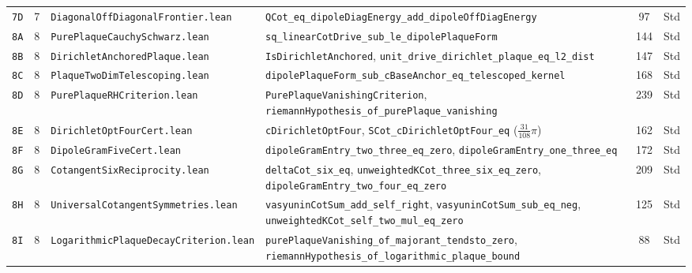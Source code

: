 \documentclass[11pt,a4paper]{article}
\theoremstyle{definition}
\begin{document}
\begin{longtable}{@{}ll>{\raggedright\arraybackslash}p{5.2cm}>{\raggedright\arraybackslash}p{6.8cm}cc@{}}
\texttt{7D} & 7 & \texttt{DiagonalOffDiagonalFrontier.lean} & \texttt{QCot\_\allowbreak eq\_\allowbreak dipoleDiagEnergy\_\allowbreak add\_\allowbreak dipoleOffDiagEnergy} & 97 & Std \\
\texttt{8A} & 8 & \texttt{PurePlaqueCauchySchwarz.lean} & \texttt{sq\_\allowbreak linearCotDrive\_\allowbreak sub\_\allowbreak le\_\allowbreak dipolePlaqueForm} & 144 & Std \\
\texttt{8B} & 8 & \texttt{DirichletAnchoredPlaque.lean} & \texttt{IsDirichletAnchored}, \texttt{unit\_\allowbreak drive\_\allowbreak dirichlet\_\allowbreak plaque\_\allowbreak eq\_\allowbreak l2\_\allowbreak dist} & 147 & Std \\
\texttt{8C} & 8 & \texttt{PlaqueTwoDimTelescoping.lean} & \texttt{dipolePlaqueForm\_\allowbreak sub\_\allowbreak cBaseAnchor\_\allowbreak eq\_\allowbreak telescoped\_\allowbreak kernel} & 168 & Std \\
\texttt{8D} & 8 & \texttt{PurePlaqueRHCriterion.lean} & \texttt{PurePlaqueVanishingCriterion}, \texttt{riemannHypothesis\_\allowbreak of\_\allowbreak purePlaque\_\allowbreak vanishing} & 239 & Std \\
\texttt{8E} & 8 & \texttt{DirichletOptFourCert.lean} & \texttt{cDirichletOptFour}, \texttt{SCot\_\allowbreak cDirichletOptFour\_\allowbreak eq} ($\tfrac{31}{108}\pi$) & 162 & Std \\
\texttt{8F} & 8 & \texttt{DipoleGramFiveCert.lean} & \texttt{dipoleGramEntry\_\allowbreak two\_\allowbreak three\_\allowbreak eq\_\allowbreak zero}, \texttt{dipoleGramEntry\_\allowbreak one\_\allowbreak three\_\allowbreak eq} & 172 & Std \\
\texttt{8G} & 8 & \texttt{CotangentSixReciprocity.lean} & \texttt{deltaCot\_\allowbreak six\_\allowbreak eq}, \texttt{unweightedKCot\_\allowbreak three\_\allowbreak six\_\allowbreak eq\_\allowbreak zero}, \texttt{dipoleGramEntry\_\allowbreak two\_\allowbreak four\_\allowbreak eq\_\allowbreak zero} & 209 & Std \\
\texttt{8H} & 8 & \texttt{UniversalCotangentSymmetries.lean} & \texttt{vasyuninCotSum\_\allowbreak add\_\allowbreak self\_\allowbreak right}, \texttt{vasyuninCotSum\_\allowbreak sub\_\allowbreak eq\_\allowbreak neg}, \texttt{unweightedKCot\_\allowbreak self\_\allowbreak two\_\allowbreak mul\_\allowbreak eq\_\allowbreak zero} & 125 & Std \\
\texttt{8I} & 8 & \texttt{Logarithmic\allowbreak Plaque\allowbreak Decay\allowbreak Criterion.lean} & \texttt{purePlaque\allowbreak Vanishing\_\allowbreak of\_\allowbreak majorant\_\allowbreak tendsto\_\allowbreak zero}, \texttt{riemann\allowbreak Hypothesis\_\allowbreak of\_\allowbreak logarithmic\_\allowbreak plaque\_\allowbreak bound} & 88 & Std \\

\end{longtable}
\end{document}
